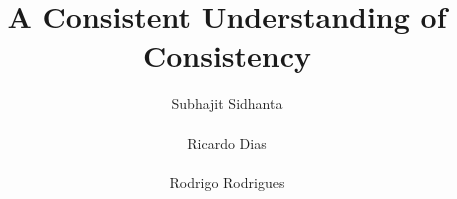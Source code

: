 \documentclass{sig-alternate-05-2015}
\begin{document}
\title{A Consistent Understanding of Consistency} 
\author{
%
%
\alignauthor
Subhajit Sidhanta\\%
       \\
\alignauthor
Ricardo Dias\\%
       \\
\alignauthor %
Rodrigo Rodrigues\\ %
       \\
}
\end{document}
